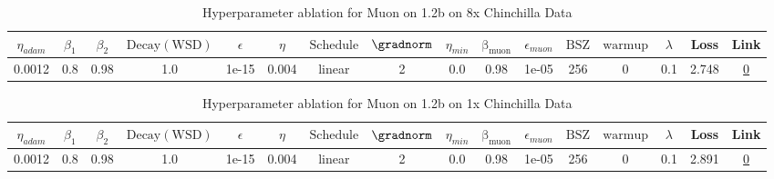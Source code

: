 \begin{table}[H]
\centering
\caption{Hyperparameter ablation for Muon on 1.2b on 8x Chinchilla Data}
\label{tab:ablation_muon_1.2b_8}
\begin{tabular}{cccccccccccccccc}
\toprule
$\eta_{adam}$ & $\beta_1$ & $\beta_2$ & $\mathrm{Decay (WSD)}$ & $\epsilon$ & $\eta$ & $\mathrm{Schedule}$ & $\gradnorm$ & $\eta_{min}$ & $\mathrm{\beta_{muon}}$ & $\epsilon_{muon}$ & $\mathrm{BSZ}$ & $\mathrm{warmup}$ & $\lambda$ & Loss & Link \\
\midrule
0.0012 & 0.8 & 0.98 & 1.0 & 1e-15 & 0.004 & linear & 2 & 0.0 & 0.98 & 1e-05 & 256 & 0 & 0.1 & 2.748 & \href{https://wandb.ai/stanford-mercury/optimizer-scaling/runs/sweep-1.2b-193B-muon4a7234lr0.004-wd0.1-minlr0.0-warmup0.0-b10.8-2335ab}{0} \\
\midrule
\bottomrule
\end{tabular}
\end{table}

\begin{table}[H]
\centering
\caption{Hyperparameter ablation for Muon on 1.2b on 1x Chinchilla Data}
\label{tab:ablation_muon_1.2b_1}
\begin{tabular}{cccccccccccccccc}
\toprule
$\eta_{adam}$ & $\beta_1$ & $\beta_2$ & $\mathrm{Decay (WSD)}$ & $\epsilon$ & $\eta$ & $\mathrm{Schedule}$ & $\gradnorm$ & $\eta_{min}$ & $\mathrm{\beta_{muon}}$ & $\epsilon_{muon}$ & $\mathrm{BSZ}$ & $\mathrm{warmup}$ & $\lambda$ & Loss & Link \\
\midrule
0.0012 & 0.8 & 0.98 & 1.0 & 1e-15 & 0.004 & linear & 2 & 0.0 & 0.98 & 1e-05 & 256 & 0 & 0.1 & 2.891 & \href{https://wandb.ai/stanford-mercury/optimizer-scaling/runs/sweep-1.2b-24B-muon42df73lr0.004-wd0.1-minlr0.0-warmup0.0-b10.8--70a4b4}{0} \\
\midrule
\bottomrule
\end{tabular}
\end{table}

